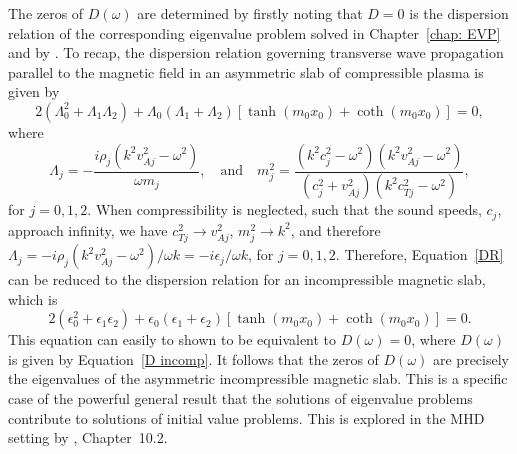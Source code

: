 \documentclass[12pt]{../style-files/ociamthesis}
\begin{document}
The zeros of $D(\omega)$ are determined by firstly noting that $D=0$ is the dispersion relation of the corresponding eigenvalue problem solved in Chapter~\ref{chap: EVP} and by \cite{zsa_etal18}. To recap, the dispersion relation governing transverse wave propagation parallel to the magnetic field in an asymmetric slab of compressible plasma is given by
\begin{equation}
2(\Lambda_0^2 + \Lambda_1 \Lambda_2) + \Lambda_0(\Lambda_1 + \Lambda_2)[\tanh(m_0x_0) + \coth(m_0x_0)] = 0,
\label{DR}
\end{equation}
where
\begin{equation}
\Lambda_j = -\frac{i\rho_j(k^2v_{Aj}^2 - \omega^2)}{\omega m_j},
\quad
\text{and}
\quad
m_j^2 = \frac{(k^2c_j^2 - \omega^2)(k^2v_{Aj}^2 - \omega^2)}{(c_j^2 + v_{Aj}^2)(k^2c_{Tj}^2 - \omega^2)},
\end{equation}
for $j = 0, 1, 2$. When compressibility is neglected, such that the sound speeds, $c_j$, approach infinity, we have $c_{Tj}^2 \to v_{Aj}^2$, $m_j^2 \to k^2$, and therefore $\Lambda_j = -i\rho_j(k^2v_{Aj}^2 - \omega^2)/\omega k = -i\epsilon_j / \omega k$, for $j=0,1,2$. Therefore, Equation~\eqref{DR} can be reduced to the dispersion relation for an incompressible magnetic slab, which is
\begin{equation}
2\left(\epsilon_0^2 + \epsilon_1 \epsilon_2\right) + \epsilon_0(\epsilon_1 + \epsilon_2)[\tanh(m_0x_0) + \coth(m_0x_0)] = 0.
\end{equation}
This equation can easily to shown to be equivalent to $D(\omega) = 0$, where $D(\omega)$ is given by Equation~\eqref{D incomp}. It follows that the zeros of $D(\omega)$ are precisely the eigenvalues of the asymmetric incompressible magnetic slab. This is a specific case of the powerful general result that the solutions of eigenvalue problems contribute to solutions of initial value problems. This is explored in the MHD setting by \cite{goe_etal04}, Chapter~10.2.
\end{document}
